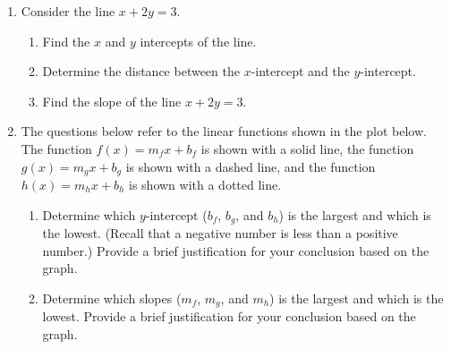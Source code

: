 \begin{enumerate}
\item Consider the line $x+2y=3$.
  \begin{enumerate}
  \item Find the $x$ and $y$ intercepts of the line.
  \item Determine the distance between the $x$-intercept and the $y$-intercept.
  \item Find the slope of the line $x+2y=3$.
  \end{enumerate}

\item The questions below refer to the linear functions shown in the
  plot below. The function $f(x)=m_f x + b_f$ is shown with a solid
  line, the function $g(x)=m_g x + b_g$ is shown with a dashed line,
  and the function $h(x) = m_h x + b_h$ is shown with a dotted line.


  \begin{enumerate}
    \item Determine which $y$-intercept ($b_f$, $b_g$, and $b_h$)
    is the largest and which is the lowest. (Recall that a negative
    number is less than a positive number.) Provide a brief
    justification for your conclusion based on the graph.

    \item Determine which slopes ($m_f$, $m_g$, and $m_h$) is the
    largest and which is the lowest.  Provide a brief justification
    for your conclusion based on the graph.


\end{enumerate}
\end{enumerate}

